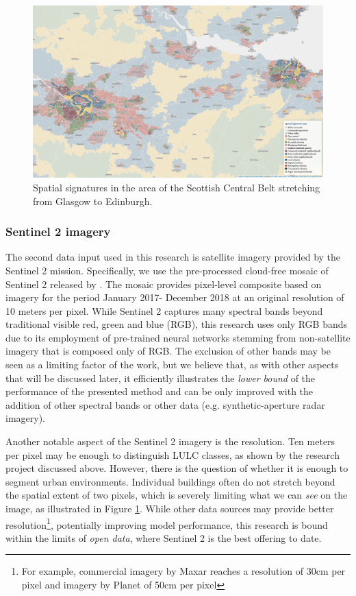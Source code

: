 \begin{figure}
    \centering
    \includegraphics[width=.8\linewidth]{fig/signatures_scotland.png}
    \caption{Spatial signatures in the area of the Scottish Central Belt stretching from Glasgow to Edinburgh.}
    \label{fig:signatures}
\end{figure}



\subsubsection{Sentinel 2 imagery}


The second data input used in this research is satellite imagery provided by the
Sentinel 2 mission. Specifically, we use the pre-processed cloud-free mosaic of Sentinel
2 released by \cite{CORBANE2020105737}.
The mosaic provides pixel-level composite based on imagery for the period January 2017-
December 2018 at an original resolution of 10 meters per pixel. While Sentinel 2
captures many spectral bands beyond traditional visible red, green and blue (RGB), this
research uses only RGB bands due to its employment of pre-trained neural networks
stemming from non-satellite imagery that is composed only of RGB. The exclusion of other
bands may be seen as a limiting factor of the work, but we believe that, as with other
aspects that will be discussed later, it efficiently illustrates the \textit{lower
bound} of the performance of the presented method and can be only improved with the addition of
other spectral bands or other data (e.g. synthetic-aperture radar imagery).

Another notable aspect of the Sentinel 2 imagery is the resolution. Ten meters per pixel
may be enough to distinguish LULC classes, as shown by the research project discussed
above. However, there is the question of whether it is enough to segment urban
environments. Individual buildings often do not stretch beyond the spatial extent of two
pixels, which is severely limiting what we can \textit{see} on the image, as illustrated
in Figure \ref{fig:signatures}. While other data sources may provide better
resolution\footnote{For example, commercial imagery by Maxar reaches a resolution of
30cm per pixel and imagery by Planet of 50cm per pixel}, potentially improving model
performance, this research is bound within the limits of \textit{open data}, where
Sentinel 2 is the best offering to date.


